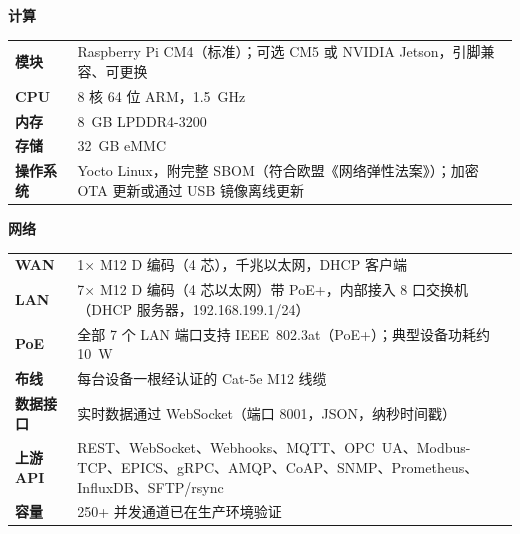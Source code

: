 \documentclass[10pt,a4paper]{article}
\begin{document}
\vspace{2mm}
\begin{minipage}[t]{0.48\textwidth}
\textbf{计算}\par\vspace{1mm}
\begin{tabularx}{\textwidth}{@{}>{\bfseries}p{2.9cm}X@{}}
\toprule
模块 & Raspberry Pi CM4（标准）；可选 CM5 或 NVIDIA Jetson，引脚兼容、可更换 \\
CPU & 8 核 64 位 ARM，\SI{1.5}{GHz} \\
内存 & \SI{8}{GB} LPDDR4-3200 \\
存储 & \SI{32}{GB} eMMC \\
操作系统 & Yocto Linux，附完整 SBOM（符合欧盟《网络弹性法案》）；加密 OTA 更新或通过 USB 镜像离线更新 \\
\bottomrule
\end{tabularx}

\vspace{2mm}
\textbf{网络}\par\vspace{1mm}
\begin{tabularx}{\textwidth}{@{}>{\bfseries}p{2.9cm}X@{}}
\toprule
WAN & 1$\times$ M12 D 编码（4 芯），千兆以太网，DHCP 客户端 \\
LAN & 7$\times$ M12 D 编码（4 芯以太网）带 PoE+，内部接入 8 口交换机（DHCP 服务器，192.168.199.1/24）\\
PoE & 全部 7 个 LAN 端口支持 IEEE~802.3at（PoE+）；典型设备功耗约 \SI{10}{W} \\
布线 & 每台设备一根经认证的 Cat-5e M12 线缆 \\
数据接口 & 实时数据通过 WebSocket（端口 8001，JSON，纳秒时间戳）\\
上游 API & REST、WebSocket、Webhooks、MQTT、OPC~UA、Modbus-TCP、EPICS、gRPC、AMQP、CoAP、SNMP、Prometheus、InfluxDB、SFTP/rsync \\
容量 & 250+ 并发通道已在生产环境验证 \\
\bottomrule
\end{tabularx}
\end{minipage}\hfill
\end{document}
